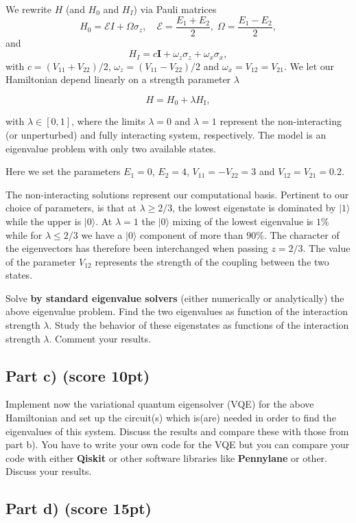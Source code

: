 \documentclass[%
oneside,                 %
final,                   %
10pt]{article}
\begin{document}
We rewrite $H$ (and $H_0$ and $H_I$)  via Pauli matrices
\[
H_0 = \mathcal{E} I + \Omega \sigma_z, \quad \mathcal{E} = \frac{E_1
  + E_2}{2}, \; \Omega = \frac{E_1-E_2}{2},
\]
and
\[
H_I = c \bm{I} +\omega_z\sigma_z + \omega_x\sigma_x,
\]
with $c = (V_{11}+V_{22})/2$, $\omega_z = (V_{11}-V_{22})/2$ and $\omega_x = V_{12}=V_{21}$.
We let our Hamiltonian depend linearly on a strength parameter $\lambda$

\[
H=H_0+\lambda H_\mathrm{I},
\]

with $\lambda \in [0,1]$, where the limits $\lambda=0$ and $\lambda=1$
represent the non-interacting (or unperturbed) and fully interacting
system, respectively.  The model is an eigenvalue problem with only
two available states.

Here we set the parameters $E_1=0$,
$E_2=4$, $V_{11}=-V_{22}=3$ and $V_{12}=V_{21}=0.2$.

The non-interacting solutions represent our computational basis.
Pertinent to our choice of parameters, is that at $\lambda\geq 2/3$,
the lowest eigenstate is dominated by $\vert 1\rangle$ while the upper
is $\vert 0 \rangle$. At $\lambda=1$ the $\vert 0 \rangle$ mixing of
the lowest eigenvalue is $1\%$ while for $\lambda\leq 2/3$ we have a
$\vert 0 \rangle$ component of more than $90\%$.  The character of the
eigenvectors has therefore been interchanged when passing $z=2/3$. The
value of the parameter $V_{12}$ represents the strength of the coupling
between the two states.

Solve \textbf{by standard eigenvalue solvers} (either numerically or analytically) the above eigenvalue problem.
Find the two eigenvalues as function of the interaction strength $\lambda$.
Study the behavior of these eigenstates as functions of the interaction strength $\lambda$.
Comment your results.

\subsection*{Part c) (score 10pt)}

Implement now the variational quantum eigensolver (VQE) for the above
Hamiltonian and set up the circuit(s) which is(are) needed in order to find
the eigenvalues of this system. Discuss the results and compare these
with those from part b). You have to write your own code for the VQE but you can compare your code
with either \textbf{Qiskit} or other software libraries like \textbf{Pennylane} or other.
Discuss your results.

\subsection*{Part d) (score 15pt)}
\end{document}
